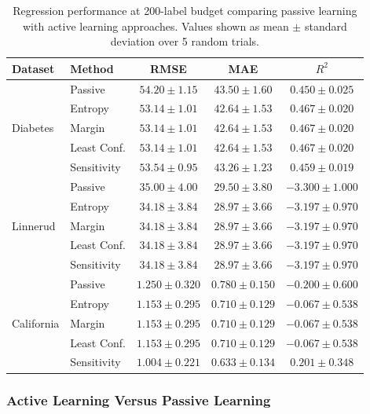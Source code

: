 \documentclass[conference]{IEEEtran}
\begin{document}
\begin{table}[t]
\centering
\caption{Regression performance at 200-label budget comparing passive learning with active learning approaches. Values shown as mean $\pm$ standard deviation over 5 random trials.}
\label{tab:reg-results}
\begin{tabular}{llccc}
\toprule
Dataset & Method & RMSE & MAE & $R^2$ \\
\midrule
\multirow{5}{*}{Diabetes} & Passive & $54.20 \pm 1.15$ & $43.50 \pm 1.60$ & $0.450 \pm 0.025$ \\
 & Entropy & $53.14 \pm 1.01$ & $42.64 \pm 1.53$ & $0.467 \pm 0.020$ \\
 & Margin & $53.14 \pm 1.01$ & $42.64 \pm 1.53$ & $0.467 \pm 0.020$ \\
 & Least Conf. & $53.14 \pm 1.01$ & $42.64 \pm 1.53$ & $0.467 \pm 0.020$ \\
 & Sensitivity & $53.54 \pm 0.95$ & $43.26 \pm 1.23$ & $0.459 \pm 0.019$ \\
\midrule
\multirow{5}{*}{Linnerud} & Passive & $35.00 \pm 4.00$ & $29.50 \pm 3.80$ & $-3.300 \pm 1.000$ \\
 & Entropy & $34.18 \pm 3.84$ & $28.97 \pm 3.66$ & $-3.197 \pm 0.970$ \\
 & Margin & $34.18 \pm 3.84$ & $28.97 \pm 3.66$ & $-3.197 \pm 0.970$ \\
 & Least Conf. & $34.18 \pm 3.84$ & $28.97 \pm 3.66$ & $-3.197 \pm 0.970$ \\
 & Sensitivity & $34.18 \pm 3.84$ & $28.97 \pm 3.66$ & $-3.197 \pm 0.970$ \\
\midrule
\multirow{5}{*}{California} & Passive & $1.250 \pm 0.320$ & $0.780 \pm 0.150$ & $-0.200 \pm 0.600$ \\
 & Entropy & $1.153 \pm 0.295$ & $0.710 \pm 0.129$ & $-0.067 \pm 0.538$ \\
 & Margin & $1.153 \pm 0.295$ & $0.710 \pm 0.129$ & $-0.067 \pm 0.538$ \\
 & Least Conf. & $1.153 \pm 0.295$ & $0.710 \pm 0.129$ & $-0.067 \pm 0.538$ \\
 & Sensitivity & $\mathbf{1.004 \pm 0.221}$ & $\mathbf{0.633 \pm 0.134}$ & $\mathbf{0.201 \pm 0.348}$ \\
\bottomrule
\end{tabular}
\end{table}

\subsubsection{Active Learning Versus Passive Learning}
\end{document}
